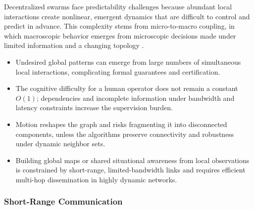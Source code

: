 Decentralized swarms face predictability challenges because abundant local
interactions create nonlinear, emergent dynamics that are difficult to control
and predict in advance. This complexity stems from micro-to-macro coupling, in
which macroscopic behavior emerges from microscopic decisions made under limited
information and a changing topology \cite{kolling2016human,brambilla2013swarm}.
\begin{itemize}
  \item {} Undesired global patterns can emerge from
        large numbers of simultaneous local interactions, complicating formal
        guarantees and certification.
  \item {} The cognitive difficulty for a human operator does
        not remain a constant $O(1)$; dependencies and incomplete information
        under bandwidth and latency constraints increase the supervision burden.
  \item {} Motion reshapes the graph and risks
        fragmenting it into disconnected components, unless the algorithms
        preserve connectivity and robustness under dynamic neighbor sets.
  \item {} Building global maps or shared situational
        awareness from local observations is constrained by short-range,
        limited-bandwidth links and requires efficient multi-hop dissemination in
        highly dynamic networks.
\end{itemize}

\subsubsection{Short-Range Communication}

